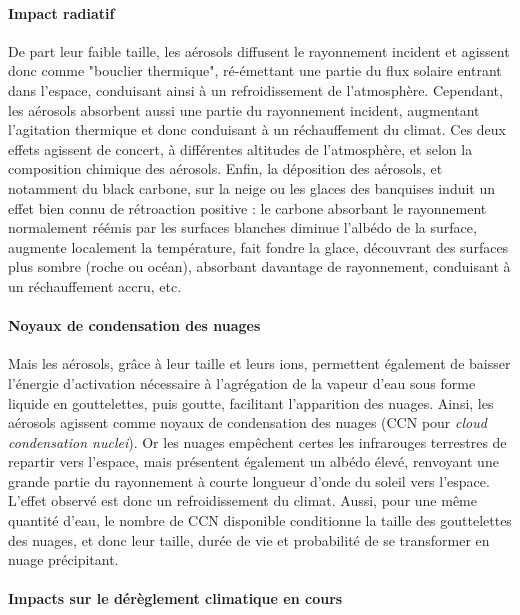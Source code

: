 \paragraph{Impact radiatif}%
\label{par:impact_radiatif}

De part leur faible taille, les aérosols diffusent le rayonnement incident et agissent donc
comme "bouclier thermique", ré-émettant une partie du flux solaire entrant dans l'espace,
conduisant ainsi à un refroidissement de l'atmosphère.
Cependant, les aérosols absorbent aussi une partie du rayonnement incident, augmentant
l'agitation thermique et donc conduisant à un réchauffement du climat.
Ces deux effets agissent de concert, à différentes altitudes de l'atmosphère, et selon la
composition chimique des aérosols.
Enfin, la déposition des aérosols, et notamment du black carbone, sur la neige ou les
glaces des banquises induit un effet bien connu de rétroaction positive : le carbone
absorbant le rayonnement normalement réémis par les surfaces blanches diminue l'albédo de
la surface, augmente localement la température, fait fondre la glace, découvrant des
surfaces plus sombre (roche ou océan), absorbant davantage de rayonnement, conduisant à
un réchauffement accru, etc.

\paragraph{Noyaux de condensation des nuages}%
\label{par:noyaux_de_condensation_des_nuages}

Mais les aérosols, grâce à leur taille et leurs ions, permettent également de baisser
l'énergie d'activation nécessaire à l'agrégation de la vapeur d'eau sous forme liquide en
gouttelettes, puis goutte, facilitant l'apparition des nuages. Ainsi, les aérosols agissent
comme noyaux de condensation des nuages (CCN pour \textit{cloud condensation nuclei}). Or
les nuages empêchent certes les infrarouges terrestres de repartir vers l'espace, mais
présentent également un albédo élevé, renvoyant une grande partie du rayonnement à courte
longueur d'onde du soleil vers l'espace. L'effet observé est donc un refroidissement du
climat.
Aussi, pour une même quantité d'eau, le nombre de CCN disponible conditionne la taille des
gouttelettes des nuages, et donc leur taille, durée de vie et probabilité de se
transformer en nuage précipitant.

\paragraph{Impacts sur le dérèglement climatique en cours}%
\label{par:impacts_sur_le_dereglement_climatique_en_cours}

